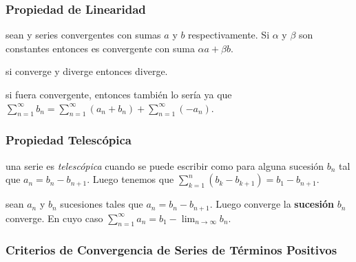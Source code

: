 \hypertarget{propiedad-de-linearidad}{%
\subsubsection{Propiedad de Linearidad}\label{propiedad-de-linearidad}}

\Teorema sean  y  series convergentes con sumas
\(a\) y \(b\) respectivamente. Si \(\alpha\) y \(\beta\) son constantes
entonces  es convergente con suma \(\alpha a + \beta b\).

\Corolario si  converge y  diverge entonces
 diverge.

\Demostracion si  fuera convergente, entonces también
lo sería  ya que
\(\ensuremath{\sum_{n=1}^\infty b_n} = \ensuremath{\sum_{n=1}^\infty (a_n + b_n)} + \ensuremath{\sum_{n=1}^\infty (-a_n)}\).

\hypertarget{propiedad-telescuxf3pica}{%
\subsubsection{Propiedad Telescópica}\label{propiedad-telescuxf3pica}}

\Definicion una serie  es \emph{telescópica} cuando se puede
escribir como  para alguna sucesión \(b_n\) tal
que \(a_n = b_n - b_{n+1}\). Luego tenemos que
\(\ensuremath{\sum_{k=1}^{n} (b_k - b_{k+1})} = b_1 - b_{n+1}\).

\Teorema sean \(a_n\) y \(b_n\) sucesiones tales que
\(a_n = b_n - b_{n+1}\). Luego  converge \sii la
\textbf{sucesión} \(b_n\) converge. En cuyo caso
\(\ensuremath{\sum_{n=1}^\infty a_n} = b_1 - \ensuremath{\lim_{n \to \infty} b_n}\).

\hypertarget{criterios-de-convergencia-de-series-de-tuxe9rminos-positivos}{%
\subsubsection{Criterios de Convergencia de Series de Términos
Positivos}\label{criterios-de-convergencia-de-series-de-tuxe9rminos-positivos}}

